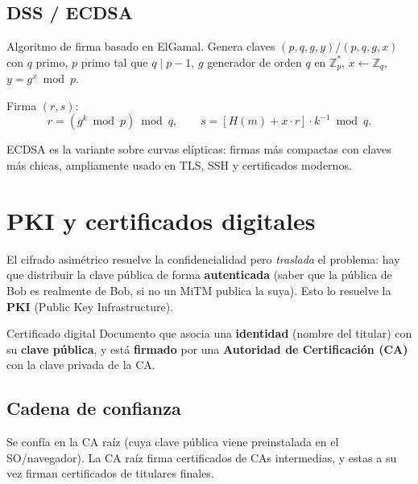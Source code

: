 \documentclass[11pt,a4paper]{article}
\begin{document}
\subsection{DSS / ECDSA}

Algoritmo de firma basado en ElGamal. Genera claves $(p, q, g, y)/(p, q, g, x)$ con
$q$ primo, $p$ primo tal que $q \mid p-1$, $g$ generador de orden $q$ en
$\mathbb{Z}_p^*$, $x \leftarrow \mathbb{Z}_q$, $y = g^x \bmod p$.

Firma $(r, s)$:
\[
  r = (g^k \bmod p) \bmod q, \qquad
  s = [H(m) + x \cdot r] \cdot k^{-1} \bmod q.
\]

ECDSA es la variante sobre curvas elípticas: firmas más compactas con claves más
chicas, ampliamente usado en TLS, SSH y certificados modernos.

\section{PKI y certificados digitales}

El cifrado asimétrico resuelve la confidencialidad pero \emph{traslada} el problema:
hay que distribuir la clave pública de forma \textbf{autenticada} (saber que la
pública de Bob es realmente de Bob, si no un MiTM publica la suya). Esto lo
resuelve la \textbf{PKI} (Public Key Infrastructure).

\begin{definicion}{Certificado digital}
Documento que asocia una \textbf{identidad} (nombre del titular) con su
\textbf{clave pública}, y está \textbf{firmado} por una \textbf{Autoridad de
Certificación (CA)} con la clave privada de la CA.
\end{definicion}

\subsection{Cadena de confianza}

Se confía en la CA raíz (cuya clave pública viene preinstalada en el SO/navegador).
La CA raíz firma certificados de CAs intermedias, y estas a su vez firman
certificados de titulares finales.
\end{document}
